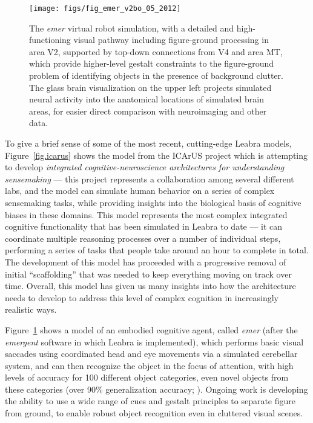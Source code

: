 \documentclass[11pt,twoside]{article}
\begin{document}
\begin{figure}
  \centering\texttt{[image: figs/fig\_emer\_v2bo\_05\_2012]}
  \caption{\small The {\em emer} virtual robot simulation, with a detailed and high-functioning visual pathway including figure-ground processing in area V2, supported by top-down connections from V4 and area MT, which provide higher-level gestalt constraints to the figure-ground problem of identifying objects in the presence of background clutter.  The glass brain visualization on the upper left projects simulated neural activity into the anatomical locations of simulated brain areas, for easier direct comparison with neuroimaging and other data.}
  \label{fig.emer}
\end{figure}


To give a brief sense of some of the most recent, cutting-edge Leabra models,
Figure~\ref{fig.icarus} shows the model from the ICArUS project which is
attempting to develop {\em integrated cognitive-neuroscience architectures for
  understanding sensemaking} --- this project represents a collaboration among
several different labs, and the model can simulate human behavior on a series
of complex sensemaking tasks, while providing insights into the biological
basis of cognitive biases in these domains.  This model represents the most
complex integrated cognitive functionality that has been simulated in Leabra
to date --- it can coordinate multiple reasoning processes over a number of
individual steps, performing a series of tasks that people take around an hour
to complete in total.  The development of this model has proceeded with a
progressive removal of initial ``scaffolding'' that was needed to keep
everything moving on track over time.  Overall, this model has given us many
insights into how the architecture needs to develop to address this level of
complex cognition in increasingly realistic ways.

Figure~\ref{fig.emer} shows a model of an embodied cognitive agent, called
{\em emer} (after the {\em emergent} software in which Leabra is implemented),
which performs basic visual saccades using coordinated head and eye movements
via a simulated cerebellar system, and can then recognize the object in the
focus of attention, with high levels of accuracy for 100 different object
categories, even novel objects from these categories (over 90\% generalization
accuracy; ).  Ongoing work is developing the ability to
use a wide range of cues and gestalt principles to separate figure from
ground, to enable robust object recognition even in cluttered visual scenes.
\end{document}
